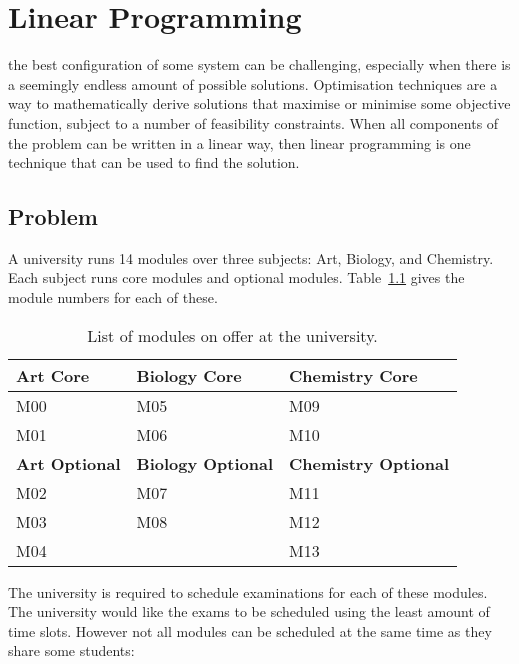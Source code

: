 \chapter[Linear programming]{Linear Programming}\label{chp:linear_programming}


 the best configuration of some system can be
challenging, especially when there is a seemingly endless amount of possible
solutions. Optimisation techniques are a way to mathematically derive solutions
that maximise or minimise some objective function, subject to a number of
feasibility constraints. When all components of the problem can be written in a
linear way, then linear programming is one technique that can be used to find
the solution.

\section{Problem}\label{sec:linear_programming_problem}

A university runs 14 modules over three subjects: Art, Biology, and Chemistry.
Each subject runs core modules and optional modules.
Table~\ref{tab:modules} gives the module numbers for each of these.

\begin{table}
\begin{center}
\begin{tabular}{lll}
\toprule
\textbf{Art Core} & \textbf{Biology Core} & \textbf{Chemistry Core} \\
\midrule
M00 & M05 & M09 \\
M01 & M06 & M10 \\
\midrule
\textbf{Art Optional} & \textbf{Biology Optional} & \textbf{Chemistry Optional}\\
\midrule
M02 & M07 & M11 \\
M03 & M08 & M12 \\
M04 &     & M13 \\
\bottomrule
\end{tabular}
\end{center}
\caption{List of modules on offer at the university.}
\label{tab:modules}
\end{table}

The university is required to schedule examinations for each of these modules.
The university would like the exams to be scheduled using the least amount of
time slots. However not all modules can be scheduled at the same time
as they share some students:

